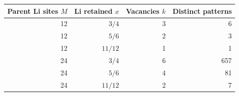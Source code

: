 \begin{tabular}{rrrr}
\toprule
Parent Li sites $M$ & Li retained $x$ & Vacancies $k$ & Distinct patterns\\
\midrule
12 & $3/4$ & 3 & 6 \\
12 & $5/6$ & 2 & 3 \\
12 & $11/12$ & 1 & 1 \\
24 & $3/4$ & 6 & 657 \\
24 & $5/6$ & 4 & 81 \\
24 & $11/12$ & 2 & 7 \\
\bottomrule
\end{tabular}

